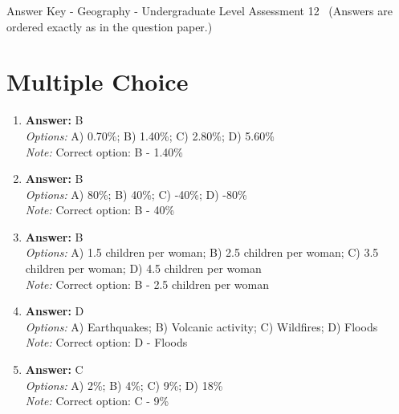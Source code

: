 \documentclass[12pt]{article}
\begin{document}
\begin{center}
Answer Key - Geography - Undergraduate Level Assessment 12 \
\small (Answers are ordered exactly as in the question paper.)
\end{center}

\section*{Multiple Choice}
\begin{enumerate}[label=\arabic*.]
\item \textbf{Answer:} B
\\ \textit{Options:} A) 0.70\%; B) 1.40\%; C) 2.80\%; D) 5.60\%
\\ \textit{Note:} Correct option: B - 1.40\%
\item \textbf{Answer:} B
\\ \textit{Options:} A) 80\%; B) 40\%; C) -40\%; D) -80\%
\\ \textit{Note:} Correct option: B - 40\%
\item \textbf{Answer:} B
\\ \textit{Options:} A) 1.5 children per woman; B) 2.5 children per woman; C) 3.5 children per woman; D) 4.5 children per woman
\\ \textit{Note:} Correct option: B - 2.5 children per woman
\item \textbf{Answer:} D
\\ \textit{Options:} A) Earthquakes; B) Volcanic activity; C) Wildfires; D) Floods
\\ \textit{Note:} Correct option: D - Floods
\item \textbf{Answer:} C
\\ \textit{Options:} A) 2\%; B) 4\%; C) 9\%; D) 18\%
\\ \textit{Note:} Correct option: C - 9\%
\end{enumerate}
\end{document}
